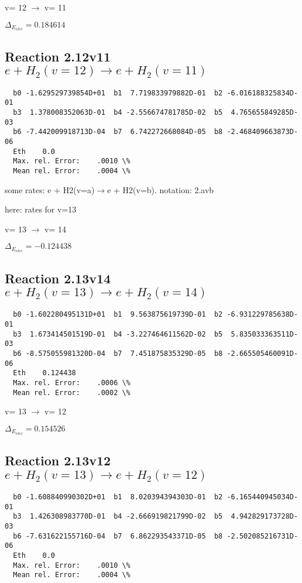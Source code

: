 \documentclass[12pt,dvipdfmx]{article}
\begin{document}
  v=  12 $\rightarrow$ v= 11

$\Delta_{E_{elec}}= 0.184614$


\subsection{
Reaction 2.12v11
$ e + H_2(v=12) \rightarrow e + H_2(v=11) $
}


\begin{small}\begin{verbatim}
  b0 -1.629529739854D+01  b1  7.719833979882D-01  b2 -6.016188325834D-01
  b3  1.378008352063D-01  b4 -2.556674781785D-02  b5  4.765655849285D-03
  b6 -7.442009918713D-04  b7  6.742272668084D-05  b8 -2.468409663873D-06
  Eth    0.0
  Max. rel. Error:    .0010 \%
  Mean rel. Error:    .0004 \%

\end{verbatim}\end{small}
\newpage
some rates: e + H2(v=a)$\rightarrow$e + H2(v=b). notation: 2.avb

here: rates for v=13


  v=  13 $\rightarrow$ v= 14

$\Delta_{E_{elec}}=-0.124438$


\subsection{
Reaction 2.13v14
$ e + H_2(v=13) \rightarrow e + H_2(v=14) $
}


\begin{small}\begin{verbatim}
  b0 -1.602280495131D+01  b1  9.563875619739D-01  b2 -6.931229785638D-01
  b3  1.673414501519D-01  b4 -3.227464611562D-02  b5  5.835033363511D-03
  b6 -8.575055981320D-04  b7  7.451875835329D-05  b8 -2.665505460091D-06
  Eth    0.124438
  Max. rel. Error:    .0006 \%
  Mean rel. Error:    .0002 \%

\end{verbatim}\end{small}

  v=  13 $\rightarrow$ v= 12

$\Delta_{E_{elec}}= 0.154526$


\subsection{
Reaction 2.13v12
$ e + H_2(v=13) \rightarrow e + H_2(v=12) $
}


\begin{small}\begin{verbatim}
  b0 -1.608840990302D+01  b1  8.020394394303D-01  b2 -6.165440945034D-01
  b3  1.426308983770D-01  b4 -2.666919821799D-02  b5  4.942829173728D-03
  b6 -7.631622155716D-04  b7  6.862293543371D-05  b8 -2.502085216731D-06
  Eth    0.0
  Max. rel. Error:    .0010 \%
  Mean rel. Error:    .0004 \%

\end{verbatim}\end{small}
\end{document}

